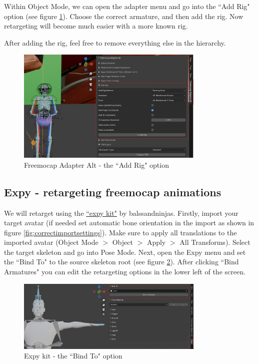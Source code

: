 \documentclass{uva-inf-article}
\begin{document}
Within Object Mode, we can open the adapter menu and go into the ``Add Rig" option (see figure \ref{fig:rigifyfreemocap}). Choose the correct armature, and then add the rig. Now retargeting will become much easier with a more known rig.

After adding the rig, feel free to remove everything else in the hierarchy.
\begin{figure}[hbt!]
    \centering
    \includegraphics[width=0.8\textwidth]{imgs/rigify.png}
    \caption{Freemocap Adapter Alt - the ``Add Rig" option}
    \label{fig:rigifyfreemocap}
\end{figure}

\subsection{Expy - retargeting freemocap animations}
We will retarget using the \href{https://ballsandninjas.gumroad.com/l/xotibs}{``expy kit"} by balssandninjas. Firstly, import your target avatar (if needed set automatic bone orientation in the import as shown in figure \ref{fig:correctimportsettings}). Make sure to apply all translations to the imported avatar (Object Mode $>$ Object $>$ Apply $>$ All Transforms). Select the target skeleton and go into Pose Mode. Next, open the Expy menu and set the ``Bind To" to the source skeleton root (see figure \ref{fig:retargetexpy}).
After clicking ``Bind Armatures" you can edit the retargeting options in the lower left of the screen.
\begin{figure}[hbt!]
    \centering
    \includegraphics[width=0.8\textwidth]{imgs/retargetExpy.png}
    \caption{Expy kit - the ``Bind To" option}
    \label{fig:retargetexpy}
\end{figure}
\end{document}
